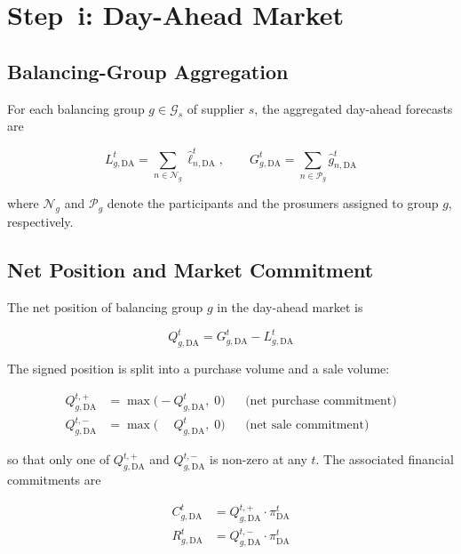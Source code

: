 \documentclass[12pt,a4paper]{article}
\begin{document}
\section{Step~i: Day-Ahead Market}

\subsection{Balancing-Group Aggregation}

For each balancing group $g \in \mathcal{G}_{s}$ of supplier $s$, the
aggregated day-ahead forecasts are

\begin{equation}
L_{g,\mathrm{DA}}^{t}
  = \sum_{n \in \mathcal{N}_{g}} \hat{\ell}_{n,\mathrm{DA}}^{t}, \qquad
G_{g,\mathrm{DA}}^{t}
  = \sum_{n \in \mathcal{P}_{g}} \hat{g}_{n,\mathrm{DA}}^{t}
\label{eq:bg_da_agg}
\end{equation}

where $\mathcal{N}_{g}$ and $\mathcal{P}_{g}$ denote the participants and the
prosumers assigned to group $g$, respectively.

\subsection{Net Position and Market Commitment}

The net position of balancing group $g$ in the day-ahead market is

\begin{equation}
Q_{g,\mathrm{DA}}^{t} = G_{g,\mathrm{DA}}^{t} - L_{g,\mathrm{DA}}^{t}
\label{eq:da_net}
\end{equation}

The signed position is split into a purchase volume and a sale volume:

\begin{align}
Q_{g,\mathrm{DA}}^{t,+} &= \max\!\bigl(-Q_{g,\mathrm{DA}}^{t},\;0\bigr)
  &&\text{(net purchase commitment)} \label{eq:da_buy}\\
Q_{g,\mathrm{DA}}^{t,-} &= \max\!\bigl(\phantom{-}Q_{g,\mathrm{DA}}^{t},\;0\bigr)
  &&\text{(net sale commitment)} \label{eq:da_sell}
\end{align}

so that only one of $Q_{g,\mathrm{DA}}^{t,+}$ and $Q_{g,\mathrm{DA}}^{t,-}$
is non-zero at any $t$.  The associated financial commitments are

\begin{align}
C_{g,\mathrm{DA}}^{t} &= Q_{g,\mathrm{DA}}^{t,+} \cdot \pi_{\mathrm{DA}}^{t}
  \label{eq:da_cost}\\
R_{g,\mathrm{DA}}^{t} &= Q_{g,\mathrm{DA}}^{t,-} \cdot \pi_{\mathrm{DA}}^{t}
  \label{eq:da_rev}
\end{align}
\end{document}
